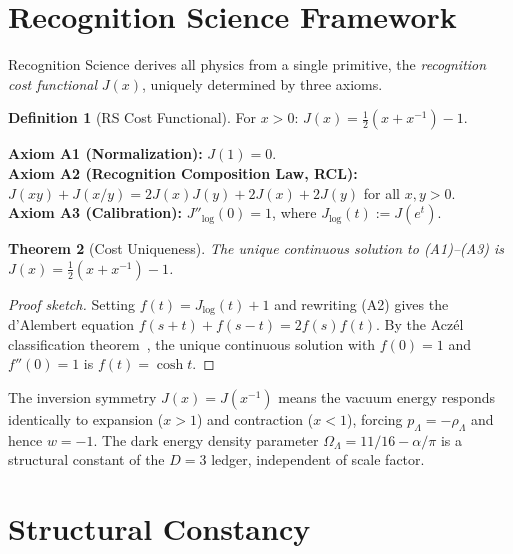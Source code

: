 \documentclass[12pt,a4paper]{article}
\newtheorem{theorem}{Theorem}[section]
\theoremstyle{definition}
\newtheorem{definition}[theorem]{Definition}
\theoremstyle{remark}
\begin{document}
\section{Recognition Science Framework}
\label{sec:framework}

Recognition Science derives all physics from a single primitive,
the \emph{recognition cost functional} $J(x)$, uniquely determined
by three axioms.

\begin{definition}[RS Cost Functional]
For $x > 0$: $J(x) = \tfrac{1}{2}(x + x^{-1}) - 1$.
\end{definition}

\noindent\textbf{Axiom A1 (Normalization):} $J(1) = 0$.\\
\textbf{Axiom A2 (Recognition Composition Law, RCL):}
$J(xy) + J(x/y) = 2J(x)J(y) + 2J(x) + 2J(y)$ for all $x, y > 0$.\\
\textbf{Axiom A3 (Calibration):} $J''_{\log}(0) = 1$, where
$J_{\log}(t) := J(e^t)$.

\begin{theorem}[Cost Uniqueness]
\label{thm:unique}
The unique continuous solution to \textup{(A1)--(A3)} is
$J(x) = \tfrac{1}{2}(x + x^{-1}) - 1$.
\end{theorem}

\begin{proof}[Proof sketch]
Setting $f(t) = J_{\log}(t) + 1$ and rewriting \textup{(A2)} gives the
d'Alembert equation $f(s+t) + f(s-t) = 2f(s)f(t)$.  By the Acz\'el
classification theorem~\cite{Aczel1966}, the unique continuous solution
with $f(0) = 1$ and $f''(0) = 1$ is $f(t) = \cosh t$.
\end{proof}

\noindent The inversion symmetry $J(x) = J(x^{-1})$ means the vacuum energy
responds identically to expansion ($x > 1$) and contraction ($x < 1$),
forcing $p_\Lambda = -\rho_\Lambda$ and hence $w = -1$.  The dark energy
density parameter $\Omega_\Lambda = 11/16 - \alpha/\pi$ is a structural
constant of the $D = 3$ ledger, independent of scale factor.

\section{Structural Constancy}
\label{sec:constancy}
\end{document}
